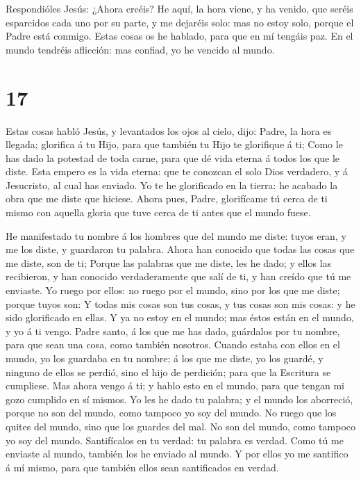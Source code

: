  Respondióles Jesús: ¿Ahora creéis?  He aquí,
la hora viene, y ha venido, que seréis esparcidos cada uno por su parte,
y me dejaréis solo: mas no estoy solo, porque el Padre está conmigo.
 Estas cosas os he hablado, para que en mí tengáis paz. En
el mundo tendréis aflicción: mas confiad, yo he vencido al mundo.

\hypertarget{section-16}{%
\section{17}\label{section-16}}

 Estas cosas habló Jesús, y levantados los ojos al cielo,
dijo: Padre, la hora es llegada; glorifica á tu Hijo, para que también
tu Hijo te glorifique á ti;  Como le has dado la potestad de
toda carne, para que dé vida eterna á todos los que le diste.
 Esta empero es la vida eterna: que te conozcan el solo Dios
verdadero, y á Jesucristo, al cual has enviado.  Yo te he
glorificado en la tierra: he acabado la obra que me diste que hiciese.
 Ahora pues, Padre, glorifícame tú cerca de ti mismo con
aquella gloria que tuve cerca de ti antes que el mundo fuese.

 He manifestado tu nombre á los hombres que del mundo me
diste: tuyos eran, y me los diste, y guardaron tu palabra. 
Ahora han conocido que todas las cosas que me diste, son de ti;
 Porque las palabras que me diste, les he dado; y ellos las
recibieron, y han conocido verdaderamente que salí de ti, y han creído
que tú me enviaste.  Yo ruego por ellos: no ruego por el
mundo, sino por los que me diste; porque tuyos son:  Y
todas mis cosas son tus cosas, y tus cosas son mis cosas: y he sido
glorificado en ellas.  Y ya no estoy en el mundo; mas éstos
están en el mundo, y yo á ti vengo. Padre santo, á los que me has dado,
guárdalos por tu nombre, para que sean una cosa, como también nosotros.
 Cuando estaba con ellos en el mundo, yo los guardaba en tu
nombre; á los que me diste, yo los guardé, y ninguno de ellos se perdió,
sino el hijo de perdición; para que la Escritura se cumpliese.
 Mas ahora vengo á ti; y hablo esto en el mundo, para que
tengan mi gozo cumplido en sí mismos.  Yo les he dado tu
palabra; y el mundo los aborreció, porque no son del mundo, como tampoco
yo soy del mundo.  No ruego que los quites del mundo, sino
que los guardes del mal.  No son del mundo, como tampoco yo
soy del mundo.  Santifícalos en tu verdad: tu palabra es
verdad.  Como tú me enviaste al mundo, también los he
enviado al mundo.  Y por ellos yo me santifico á mí mismo,
para que también ellos sean santificados en verdad.

